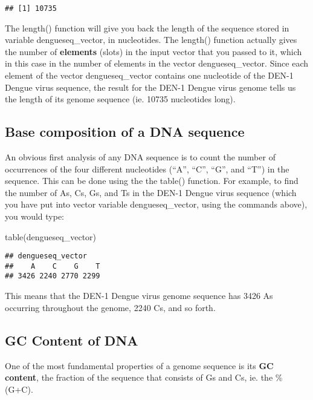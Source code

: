 \documentclass[
]{book}
\newenvironment{Shaded}{\begin{snugshade}}{\end{snugshade}}
\newcommand{\FunctionTok}[1]{\textcolor[rgb]{0.00,0.00,0.00}{#1}}
\newcommand{\NormalTok}[1]{#1}
\begin{document}
\begin{verbatim}
## [1] 10735
\end{verbatim}

The length() function will give you back the length of the sequence stored in variable dengueseq\_vector, in nucleotides. The length() function actually gives the number of \textbf{elements} (slots) in the input vector that you passed to it, which in this case in the number of elements in the vector dengueseq\_vector. Since each element of the vector dengueseq\_vector contains one nucleotide of the DEN-1 Dengue virus sequence, the result for the DEN-1 Dengue virus genome tells us the length of its genome sequence (ie. 10735 nucleotides long).

\hypertarget{base-composition-of-a-dna-sequence}{%
\subsection{Base composition of a DNA sequence}\label{base-composition-of-a-dna-sequence}}

An obvious first analysis of any DNA sequence is to count the number of occurrences of the four different nucleotides (``A'', ``C'', ``G'', and ``T'') in the sequence. This can be done using the the table() function. For example, to find the number of As, Cs, Gs, and Ts in the DEN-1 Dengue virus sequence (which you have put into vector variable dengueseq\_vector, using the commands above), you would type:

\begin{Shaded}
\begin{Highlighting}[]
\FunctionTok{table}\NormalTok{(dengueseq\_vector)}
\end{Highlighting}
\end{Shaded}

\begin{verbatim}
## dengueseq_vector
##    A    C    G    T 
## 3426 2240 2770 2299
\end{verbatim}

This means that the DEN-1 Dengue virus genome sequence has 3426 As occurring throughout the genome, 2240 Cs, and so forth.

\hypertarget{gc-content-of-dna}{%
\subsection{GC Content of DNA}\label{gc-content-of-dna}}

One of the most fundamental properties of a genome sequence is its \textbf{GC content}, the fraction of the sequence that consists of Gs and Cs, ie. the \%(G+C).
\end{document}
